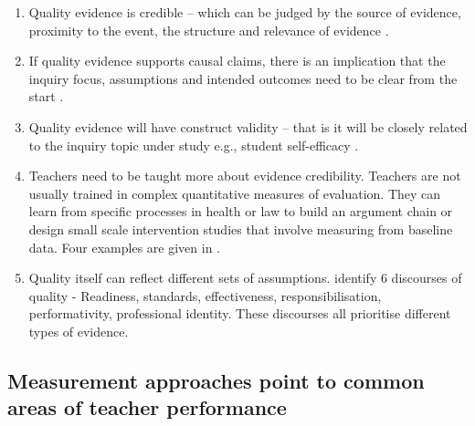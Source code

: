     \begin{enumerate}
        \item Quality evidence is credible – which can be judged by the source of evidence, proximity to the event, the structure and relevance of evidence \parencite{shepherdReframingPortfolioEvidence2013}.
        \item If quality evidence supports causal claims, there is an implication that the inquiry focus, assumptions and intended outcomes need to be clear from the start \parencite{shepherdReframingPortfolioEvidence2013}.
        \item Quality evidence will have construct validity – that is it will be closely related to the inquiry topic under study e.g., student self-efficacy \parencite{vanderschaafExploringRoleAssessment2012}.
        \item Teachers need to be taught more about evidence credibility. Teachers are not usually trained in complex quantitative measures of evaluation. They can learn from specific processes in health or law to build an argument chain or design small scale intervention studies that involve measuring from baseline data. Four examples are given in \textcite{shepherdReframingPortfolioEvidence2013}.
        \item Quality itself can reflect different sets of assumptions. \textcite{churchwardPursuitTeacherQuality2019} identify 6 discourses of quality - Readiness, standards, effectiveness, responsibilisation, performativity, professional identity. These discourses all prioritise different types of evidence. 
    \end{enumerate}

\bigskip  
\subsection{Measurement approaches point to common areas of teacher performance}
\medskip

